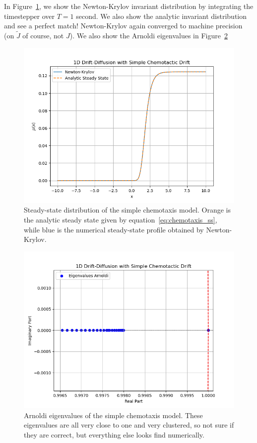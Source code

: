 \documentclass{article}
\begin{document}
In Figure~\ref{fig:simple_chemotaxis_ss}, we show the Newton-Krylov invariant distribution by integrating the timestepper over $T = 1$ second. We also show the analytic invariant distribution and see a perfect match! Newton-Krylov again converged to machine precision (on $\tilde{J}$ of course, not $J$). We also show the Arnoldi eigenvalues in Figure~\ref{fig:simple_chemotaxis_arnoldi} 
\begin{figure}[ht]
    \centering
    \includegraphics[width=0.8\linewidth]{figures/Simple Chemotaxis Steady State.png}
    \caption{Steady-state distribution of the simple chemotaxis model. Orange is the analytic steady state given by equation~\eqref{eq:chemotaxis_ss}, while blue is the numerical steady-state profile obtained by Newton-Krylov.}
    \label{fig:simple_chemotaxis_ss}
\end{figure}

\begin{figure}[ht]
    \centering
    \includegraphics[width=0.8\linewidth]{figures/Simple Chemotaxic Eigenvalues.png}
    \caption{Arnoldi eigenvalues of the simple chemotaxis model. These eigenvalues are all very close to one and very clustered, so not sure if they are correct, but everything else looks find numerically.}
    \label{fig:simple_chemotaxis_arnoldi}
\end{figure}
\end{document}
